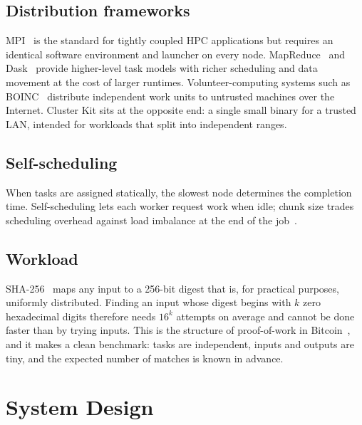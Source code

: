 \documentclass[conference,10pt]{IEEEtran}
\begin{document}
\subsection{Distribution frameworks}
MPI~\cite{mpi} is the standard for tightly coupled HPC applications but requires an identical software environment and launcher on every node. MapReduce~\cite{mapreduce} and Dask~\cite{dask} provide higher-level task models with richer scheduling and data movement at the cost of larger runtimes. Volunteer-computing systems such as BOINC~\cite{boinc} distribute independent work units to untrusted machines over the Internet. Cluster Kit sits at the opposite end: a single small binary for a trusted LAN, intended for workloads that split into independent ranges.

\subsection{Self-scheduling}
When tasks are assigned statically, the slowest node determines the completion time. Self-scheduling lets each worker request work when idle; chunk size trades scheduling overhead against load imbalance at the end of the job~\cite{factoring}.

\subsection{Workload}
SHA-256~\cite{fips180} maps any input to a 256-bit digest that is, for practical purposes, uniformly distributed. Finding an input whose digest begins with $k$ zero hexadecimal digits therefore needs $16^k$ attempts on average and cannot be done faster than by trying inputs. This is the structure of proof-of-work in Bitcoin~\cite{bitcoin}, and it makes a clean benchmark: tasks are independent, inputs and outputs are tiny, and the expected number of matches is known in advance.

\section{System Design}\label{sec:design}
\end{document}
